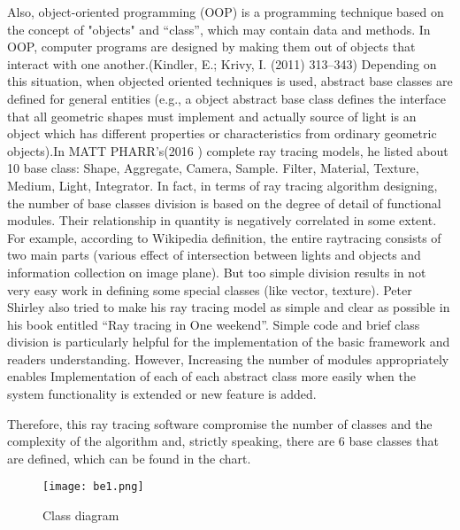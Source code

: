 \documentclass[11pt]{article}
\begin{document}
Also, object-oriented programming (OOP) is a programming technique based on the concept of "objects" and “class”, which may contain data and methods. In OOP, computer programs are designed by making them out of objects that interact with one another.(Kindler, E.; Krivy, I. (2011) 313–343) Depending on this situation, when objected oriented techniques is used, abstract base classes are defined for general entities (e.g., a object abstract base class defines the interface that all geometric shapes must implement and actually source of light is an object which has different properties or characteristics from ordinary geometric objects).In MATT PHARR’s(2016 ) complete ray tracing models, he listed about 10 base class: Shape, Aggregate, Camera, Sample. Filter, Material, Texture, Medium, Light, Integrator. In fact, in terms of ray tracing algorithm designing, the number of base classes division is based on the degree of detail of functional modules. Their relationship in quantity is negatively correlated in some extent. For example, according to Wikipedia definition, the entire raytracing consists of two main parts (various effect of intersection between lights and objects and information collection on image plane). But too simple division results in not very easy work in defining some special classes (like vector, texture). Peter Shirley also tried to make his ray tracing model as simple and clear as possible in his book entitled “Ray tracing in One weekend”. Simple code and brief class division is particularly helpful for the implementation of the basic framework and readers understanding. However, Increasing the number of modules appropriately enables Implementation of each of each abstract class more easily when the system functionality is extended or new feature is added.

Therefore, this ray tracing software compromise the number of classes and the complexity of the algorithm and, strictly speaking, there are 6 base classes that are defined, which can be found in the chart.
\newpage

\begin{figure}[H]

\centering
\texttt{[image: be1.png]}
\caption{Class diagram}
\label{fig:label}
\end{figure}
\end{document}
